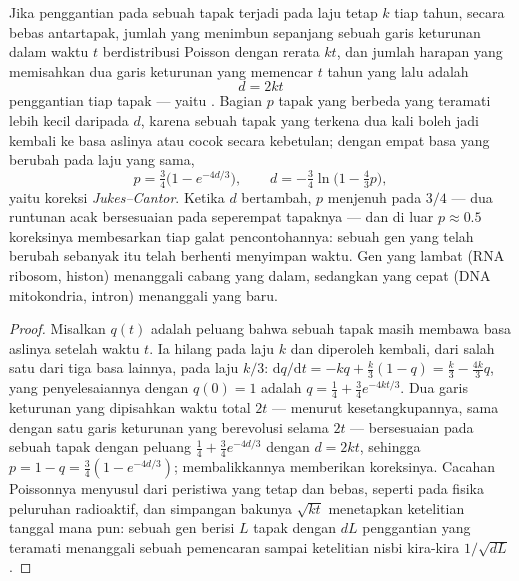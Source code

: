 \begin{theorem}\label{thm:b2:phylogenetic-trees:clock}
Jika penggantian pada sebuah tapak terjadi pada laju tetap $k$ tiap
tahun, secara bebas antartapak, jumlah yang menimbun sepanjang sebuah
garis keturunan dalam waktu $t$ berdistribusi Poisson dengan rerata
$kt$, dan jumlah harapan yang memisahkan dua garis keturunan yang
memencar $t$ tahun yang lalu adalah
\[
d = 2kt
\]
penggantian tiap tapak --- yaitu \emph{}. Bagian $p$
tapak yang berbeda yang teramati lebih kecil daripada $d$, karena
sebuah tapak yang terkena dua kali boleh jadi kembali ke basa aslinya
atau cocok secara kebetulan; dengan empat basa yang berubah pada laju
yang sama,
\[
p = \tfrac{3}{4}\bigl(1 - e^{-4d/3}\bigr), \qquad
d = -\tfrac{3}{4}\ln\bigl(1 - \tfrac{4}{3}p\bigr),
\]
yaitu koreksi \emph{Jukes--Cantor}. Ketika $d$ bertambah, $p$ menjenuh
pada $3/4$ --- dua runtunan acak bersesuaian pada seperempat tapaknya
--- dan di luar $p \approx 0.5$ koreksinya membesarkan tiap galat
pencontohannya: sebuah gen yang telah berubah sebanyak itu telah
berhenti menyimpan waktu. Gen yang lambat (RNA ribosom, histon)
menanggali cabang yang dalam, sedangkan yang cepat (DNA mitokondria,
intron) menanggali yang baru.
\end{theorem}
\begin{proof}
Misalkan $q(t)$ adalah peluang bahwa sebuah tapak masih membawa basa
aslinya setelah waktu $t$. Ia hilang pada laju $k$ dan diperoleh
kembali, dari salah satu dari tiga basa lainnya, pada laju $k/3$:
$\mathrm{d}q/\mathrm{d}t = -kq + \tfrac{k}{3}(1 - q) = \tfrac{k}{3} -
\tfrac{4k}{3}q$, yang penyelesaiannya dengan $q(0) = 1$ adalah $q = \tfrac14 +
\tfrac34 e^{-4kt/3}$. Dua garis keturunan yang dipisahkan waktu total
$2t$ --- menurut kesetangkupannya, sama dengan satu garis keturunan
yang berevolusi selama $2t$ --- bersesuaian pada sebuah tapak dengan
peluang $\tfrac14 + \tfrac34 e^{-4d/3}$ dengan $d =
2kt$, sehingga $p = 1 - q = \tfrac34(1 - e^{-4d/3})$; membalikkannya memberikan koreksinya.
Cacahan Poissonnya menyusul dari peristiwa yang tetap dan bebas,
seperti pada fisika peluruhan radioaktif, dan simpangan bakunya
$\sqrt{kt}$ menetapkan ketelitian tanggal mana pun: sebuah gen berisi
$L$ tapak dengan $dL$ penggantian yang teramati menanggali sebuah
pemencaran sampai ketelitian nisbi kira-kira $1/\sqrt{dL}$.
\end{proof}
